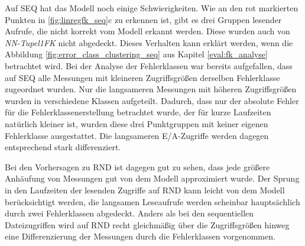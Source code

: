 \documentclass[
	12pt,
	a4paper,
	BCOR10mm,
	DIV14,
	listof=totoc,
	bibliography=totoc,
	headsepline
]{scrreprt}
\begin{document}
Auf SEQ hat das Modell noch einige Schwierigkeiten. Wie an den rot markierten Punkten in \ref{fig:linregfk_seq}c zu erkennen ist, gibt es drei Gruppen lesender Aufrufe, die nicht korrekt vom Modell erkannt werden. Diese wurden auch von \textit{NN-Tupel1FK} nicht abgedeckt.
Dieses Verhalten kann erklärt werden, wenn die Abbildung \ref{fig:error_class_clustering_seq} aus Kapitel \ref{eval:fk_analyse} betrachtet wird.
Bei der Analyse der Fehlerklassen war bereits aufgefallen, dass auf SEQ alle Messungen mit kleineren Zugriffsgrößen derselben Fehlerklasse zugeordnet wurden.
Nur die langsameren Messungen mit höheren Zugriffsgrößen wurden in verschiedene Klassen aufgeteilt.
Dadurch, dass nur der absolute Fehler für die Fehlerklassenerstellung betrachtet wurde, der für kurze Laufzeiten natürlich kleiner ist, wurden diese drei Punktgruppen mit keiner eigenen Fehlerklasse ausgestattet.
Die langsameren E/A-Zugriffe werden dagegen entsprechend stark differenziert.\medskip

Bei den Vorhersagen zu RND ist dagegen gut zu sehen, dass jede größere Anhäufung von Messungen gut von dem Modell approximiert wurde.
Der Sprung in den Laufzeiten der lesenden Zugriffe auf RND kann leicht von dem Modell berücksichtigt werden, die langsamen Leseaufrufe werden scheinbar hauptsächlich durch zwei Fehlerklassen abgedeckt.
Anders als bei den sequentiellen Dateizugriffen wird auf RND recht gleichmäßig über die Zugriffsgrößen hinweg eine Differenzierung der Messungen durch die Fehlerklassen vorgenommen.\medskip
\end{document}
